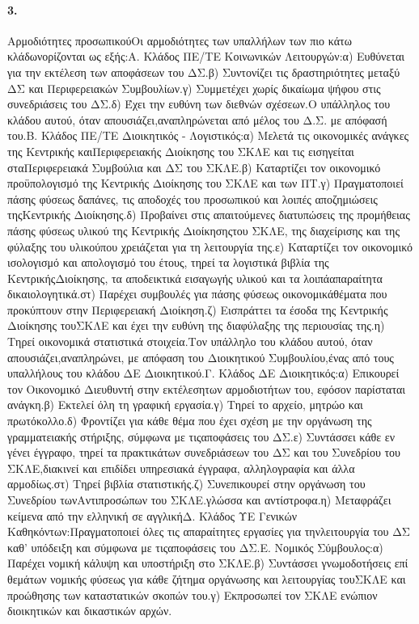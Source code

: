 \documentclass[a4paper,oneside, 10pt]{book}
\begin{document}
\paragraph { 3. } Αρμοδιότητες προσωπικούΟι αρμοδιότητες των υπαλλήλων των πιο κάτω κλάδωνορίζονται ως εξής:Α. Κλάδος ΠΕ/ΤΕ Κοινωνικών Λειτουργών:α) Ευθύνεται για την εκτέλεση των αποφάσεων του ΔΣ.β) Συντονίζει τις δραστηριότητες μεταξύ ΔΣ και Περιφερειακών Συμβουλίων.γ) Συμμετέχει χωρίς δικαίωμα ψήφου στις συνεδριάσεις του ΔΣ.δ) Έχει την ευθύνη των διεθνών σχέσεων.Ο υπάλληλος του κλάδου αυτού, όταν απουσιάζει,αναπληρώνεται από μέλος του Δ.Σ. με απόφασή του.Β. Κλάδος ΠΕ/ΤΕ Διοικητικός - Λογιστικός:α) Μελετά τις οικονομικές ανάγκες της Κεντρικής καιΠεριφερειακής Διοίκησης του ΣΚΛΕ και τις εισηγείται σταΠεριφερειακά Συμβούλια και ΔΣ του ΣΚΛΕ.β) Καταρτίζει τον οικονομικό προϋπολογισμό της Κεντρικής Διοίκησης του ΣΚΛΕ και των ΠΤ.γ) Πραγματοποιεί πάσης φύσεως δαπάνες, τις αποδοχές του προσωπικού και λοιπές αποζημιώσεις τηςΚεντρικής Διοίκησης.δ) Προβαίνει στις απαιτούμενες διατυπώσεις της προμήθειας πάσης φύσεως υλικού της Κεντρικής Διοίκησηςτου ΣΚΛΕ, της διαχείρισης και της φύλαξης του υλικούπου χρειάζεται για τη λειτουργία της.ε) Καταρτίζει τον οικονομικό ισολογισμό και απολογισμό του έτους, τηρεί τα λογιστικά βιβλία της ΚεντρικήςΔιοίκησης, τα αποδεικτικά εισαγωγής υλικού και τα λοιπάαπαραίτητα δικαιολογητικά.στ) Παρέχει συμβουλές για πάσης φύσεως οικονομικάθέματα που προκύπτουν στην Περιφερειακή Διοίκηση.ζ) Εισπράττει τα έσοδα της Κεντρικής Διοίκησης τουΣΚΛΕ και έχει την ευθύνη της διαφύλαξης της περιουσίας της.η) Τηρεί οικονομικά στατιστικά στοιχεία.Τον υπάλληλο του κλάδου αυτού, όταν απουσιάζει,αναπληρώνει, με απόφαση του Διοικητικού Συμβουλίου,ένας από τους υπαλλήλους του κλάδου ΔΕ Διοικητικού.Γ. Κλάδος ΔΕ Διοικητικός:α) Επικουρεί τον Οικονομικό Διευθυντή στην εκτέλεσητων αρμοδιοτήτων του, εφόσον παρίσταται ανάγκη.β) Εκτελεί όλη τη γραφική εργασία.γ) Τηρεί το αρχείο, μητρώο και πρωτόκολλο.δ) Φροντίζει για κάθε θέμα που έχει σχέση με την οργάνωση της γραμματειακής στήριξης, σύμφωνα με τιςαποφάσεις του ΔΣ.ε) Συντάσσει κάθε εν γένει έγγραφο, τηρεί τα πρακτικάτων συνεδριάσεων του ΔΣ και του Συνεδρίου του ΣΚΛΕ,διακινεί και επιδίδει υπηρεσιακά έγγραφα, αλληλογραφία και άλλα αρμοδίως.στ) Τηρεί βιβλία στατιστικής.ζ) Συνεπικουρεί στην οργάνωση του Συνεδρίου τωνΑντιπροσώπων του ΣΚΛΕ.γλώσσα και αντίστροφα.η) Μεταφράζει κείμενα από την ελληνική σε αγγλικήΔ. Κλάδος ΥΕ Γενικών Καθηκόντων:Πραγματοποιεί όλες τις απαραίτητες εργασίες για τηνλειτουργία του ΔΣ καθ’ υπόδειξη και σύμφωνα με τιςαποφάσεις του ΔΣ.Ε. Νομικός Σύμβουλος:α) Παρέχει νομική κάλυψη και υποστήριξη στο ΣΚΛΕ.β) Συντάσσει γνωμοδοτήσεις επί θεμάτων νομικής φύσεως για κάθε ζήτημα οργάνωσης και λειτουργίας τουΣΚΛΕ και προώθησης των καταστατικών σκοπών του.γ) Εκπροσωπεί τον ΣΚΛΕ ενώπιον διοικητικών και δικαστικών αρχών.
\end{document}
